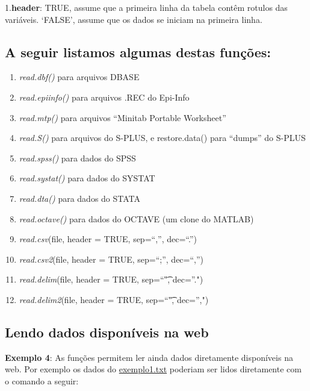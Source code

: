 \documentclass[
]{book}
\providecommand{\tightlist}{%
  \setlength{\itemsep}{0pt}\setlength{\parskip}{0pt}}
\begin{document}
1.\textbf{header}: TRUE, assume que a primeira linha da tabela contêm rotulos das variáveis. `FALSE', assume que os dados se iniciam na primeira linha.

\hypertarget{a-seguir-listamos-algumas-destas-funuxe7uxf5es}{%
\subsection{A seguir listamos algumas destas funções:}\label{a-seguir-listamos-algumas-destas-funuxe7uxf5es}}

\begin{enumerate}
\def\labelenumi{\arabic{enumi}.}
\tightlist
\item
  \emph{read.dbf()} para arquivos DBASE
\item
  \emph{read.epiinfo()} para arquivos .REC do Epi-Info
\item
  \emph{read.mtp()} para arquivos ``Minitab Portable Worksheet''
\item
  \emph{read.S()} para arquivos do S-PLUS, e restore.data() para ``dumps'' do S-PLUS
\item
  \emph{read.spss()} para dados do SPSS
\item
  \emph{read.systat()} para dados do SYSTAT
\item
  \emph{read.dta()} para dados do STATA
\item
  \emph{read.octave()} para dados do OCTAVE (um clone do MATLAB)
\item
  \emph{read.csv}(file, header = TRUE, sep=``,'', dec=``.'')
\item
  \emph{read.csv2}(file, header = TRUE, sep=``;'', dec=``,'')
\item
  \emph{read.delim}(file, header = TRUE, sep=``\t", dec=''.")
\item
  \emph{read.delim2}(file, header = TRUE, sep=``\t", dec='',")
\end{enumerate}

\hypertarget{lendo-dados-disponuxedveis-na-web}{%
\subsection{Lendo dados disponíveis na web}\label{lendo-dados-disponuxedveis-na-web}}

\textbf{Exemplo 4}: As funções permitem ler ainda dados diretamente disponíveis na web. Por exemplo os dados do \href{https://www.dropbox.com/s/m7jivbbggei5y0x/exemplo1.txt?dl=1}{exemplo1.txt} poderiam ser lidos diretamente com o comando a seguir:
\end{document}
